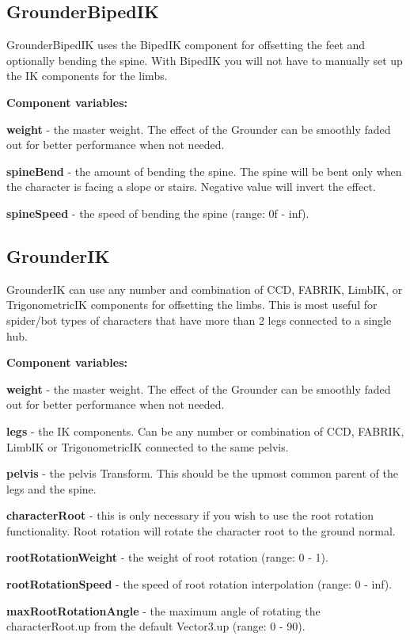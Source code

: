 \hypertarget{page11_bipedIK}{}\subsection{Grounder\+Biped\+IK}\label{page11_bipedIK}
Grounder\+Biped\+IK uses the Biped\+IK component for offsetting the feet and optionally bending the spine. With Biped\+IK you will not have to manually set up the IK components for the limbs.

{\bfseries Component variables\+:}
\begin{DoxyItemize}
\item {\bfseries weight} -\/ the master weight. The effect of the Grounder can be smoothly faded out for better performance when not needed.
\item {\bfseries spine\+Bend} -\/ the amount of bending the spine. The spine will be bent only when the character is facing a slope or stairs. Negative value will invert the effect.
\item {\bfseries spine\+Speed} -\/ the speed of bending the spine (range\+: 0f -\/ inf).
\end{DoxyItemize}

\hypertarget{page11_ik}{}\subsection{Grounder\+IK}\label{page11_ik}
Grounder\+IK can use any number and combination of C\+CD, F\+A\+B\+R\+IK, Limb\+IK, or Trigonometric\+IK components for offsetting the limbs. This is most useful for spider/bot types of characters that have more than 2 legs connected to a single hub.

{\bfseries Component variables\+:}
\begin{DoxyItemize}
\item {\bfseries weight} -\/ the master weight. The effect of the Grounder can be smoothly faded out for better performance when not needed.
\item {\bfseries legs} -\/ the IK components. Can be any number or combination of C\+CD, F\+A\+B\+R\+IK, Limb\+IK or Trigonometric\+IK connected to the same pelvis.
\item {\bfseries pelvis} -\/ the pelvis Transform. This should be the upmost common parent of the legs and the spine.
\item {\bfseries character\+Root} -\/ this is only necessary if you wish to use the root rotation functionality. Root rotation will rotate the character root to the ground normal.
\item {\bfseries root\+Rotation\+Weight} -\/ the weight of root rotation (range\+: 0 -\/ 1).
\item {\bfseries root\+Rotation\+Speed} -\/ the speed of root rotation interpolation (range\+: 0 -\/ inf).
\item {\bfseries max\+Root\+Rotation\+Angle} -\/ the maximum angle of rotating the character\+Root.\+up from the default Vector3.\+up (range\+: 0 -\/ 90).
\end{DoxyItemize}

